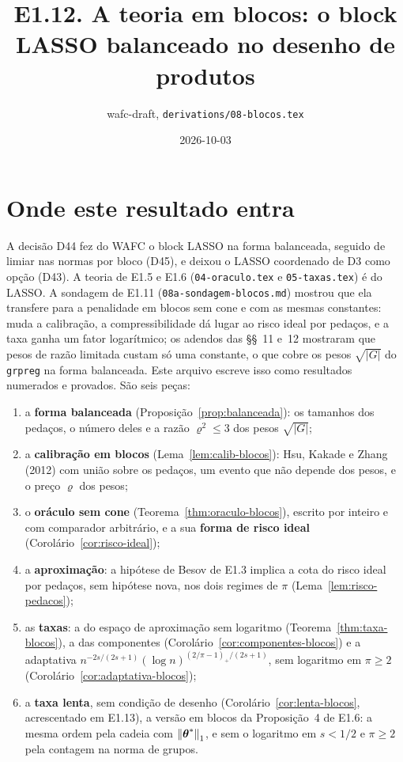 \documentclass[11pt,a4paper]{article}
\title{E1.12. A teoria em blocos: o block LASSO balanceado no desenho de
produtos}
\author{wafc-draft, \texttt{derivations/08-blocos.tex}}
\date{2026-10-03}
\begin{document}
\maketitle

\section*{Onde este resultado entra}

A decisão D44 fez do WAFC o block LASSO na forma balanceada, seguido de limiar
nas normas por bloco (D45), e deixou o LASSO coordenado de D3 como opção
(D43). A teoria de E1.5 e E1.6 (\texttt{04-oraculo.tex} e
\texttt{05-taxas.tex}) é do LASSO. A sondagem de E1.11
(\texttt{08a-sondagem-blocos.md}) mostrou que ela transfere para a penalidade
em blocos sem cone e com as mesmas constantes: muda a calibração, a
compressibilidade dá lugar ao risco ideal por pedaços, e a taxa ganha um
fator logarítmico; os adendos das §§~11 e~12 mostraram que pesos de razão
limitada custam só uma constante, o que cobre os pesos $\sqrt{|G|}$ do
\texttt{grpreg} na forma balanceada. Este arquivo escreve isso como
resultados numerados e provados. São seis peças:

\begin{enumerate}[label=(\alph*), leftmargin=*, nosep]
  \item a \textbf{forma balanceada} (Proposição~\ref{prop:balanceada}): os
    tamanhos dos pedaços, o número deles e a razão $\varrho^{2} \le 3$ dos pesos
    $\sqrt{|G|}$;
  \item a \textbf{calibração em blocos} (Lema~\ref{lem:calib-blocos}): Hsu,
    Kakade e Zhang (2012) com união sobre os pedaços, um evento que não
    depende dos pesos, e o preço $\varrho$ dos pesos;
  \item o \textbf{oráculo sem cone} (Teorema~\ref{thm:oraculo-blocos}),
    escrito por inteiro e com comparador arbitrário, e a sua \textbf{forma de
    risco ideal} (Corolário~\ref{cor:risco-ideal});
  \item a \textbf{aproximação}: a hipótese de Besov de E1.3 implica a cota do
    risco ideal por pedaços, sem hipótese nova, nos dois regimes de $\pi$
    (Lema~\ref{lem:risco-pedacos});
  \item as \textbf{taxas}: a do espaço de aproximação sem logaritmo
    (Teorema~\ref{thm:taxa-blocos}), a das componentes
    (Corolário~\ref{cor:componentes-blocos}) e a adaptativa
    $n^{-2s/(2s+1)}(\log n)^{(2/\pi-1)_{+}/(2s+1)}$, sem logaritmo em
    $\pi \ge 2$ (Corolário~\ref{cor:adaptativa-blocos});
  \item a \textbf{taxa lenta}, sem condição de desenho
    (Corolário~\ref{cor:lenta-blocos}, acrescentado em E1.13), a versão em
    blocos da Proposição~4 de E1.6: a mesma ordem pela cadeia com
    $\left\lVert \boldsymbol{\theta}^{*} \right\rVert_{1}$, e sem o logaritmo em $s < 1/2$ e $\pi \ge 2$
    pela contagem na norma de grupos.
\end{enumerate}
\end{document}
